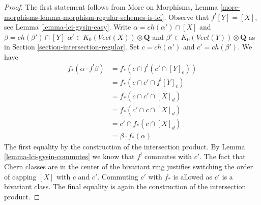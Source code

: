 \documentclass[10pt,a4paper]{amsart}
\theoremstyle{plain}
\theoremstyle{definition}
\theoremstyle{remark}
\numberwithin{equation}{subsection}
\begin{document}
\begin{proof}
The first statement follows from
More on Morphisms, Lemma
\ref{more-morphisms-lemma-morphism-regular-schemes-is-lci}.
Observe that $f^![Y] = [X]$, see Lemma \ref{lemma-lci-gysin-easy}.
Write $\alpha = ch(\alpha') \cap [X]$ and $\beta = ch(\beta') \cap [Y]$
$\alpha' \in K_0(\textit{Vect}(X)) \otimes \mathbf{Q}$ and
$\beta' \in K_0(\textit{Vect}(Y)) \otimes \mathbf{Q}$
as in Section \ref{section-intersection-regular}.
Set $c = ch(\alpha')$ and $c' = ch(\beta')$. We have
\begin{align*}
f_*(\alpha \cdot f^!\beta)
& =
f_*(c \cap f^!(c' \cap [Y]_e)) \\
& =
f_*(c \cap c' \cap f^![Y]_e) \\
& =
f_*(c \cap c' \cap [X]_d) \\
& =
f_*(c' \cap c \cap [X]_d) \\
& =
c' \cap f_*(c \cap [X]_d) \\
& =
\beta \cdot f_*(\alpha)
\end{align*}
The first equality by the construction of the intersection product.
By Lemma \ref{lemma-lci-gysin-commutes} we know that $f^!$
commutes with $c'$. The fact that Chern classes are in the center
of the bivariant ring justifies switching the order of capping
$[X]$ with $c$ and $c'$. Commuting $c'$ with $f_*$ is allowed as $c'$
is a bivariant class. The final equality is again the construction
of the intersection product.
\end{proof}
\end{document}
